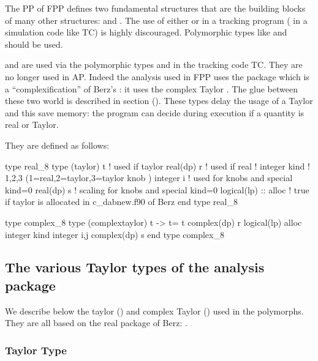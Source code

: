 \documentclass{hitec}     %
\begin{document}
{{{{{{The PP of FPP defines two fundamental structures that are the building blocks of many other structures:
 and . The  use of either  or   in a tracking program (
in a  simulation code like  TC) is highly discouraged. Polymorphic types like  and 
should be used.

  and  are used  via the polymorphic types  and  in the tracking code TC. They are no longer used in AP. Indeed the analysis used in FPP uses the package  which is a ``complexification'' of Berz's : it uses the complex Taylor . The glue between these two world is described in section (). These types delay the usage of a Taylor and this save memory: the program can decide during execution if a quantity is real or Taylor.
 


 
 
 They are defined as follows:
 
 \begin{code}
type real_8
 type (taylor) t ! used if taylor
 real(dp) r ! used if real
!
 integer kind !  1,2,3 (1=real,2=taylor,3=taylor knob )
 integer i ! used for knobs and special kind=0
 real(dp) s ! scaling for knobs and special kind=0
 logical(lp) :: alloc ! true if taylor is allocated in c_dabnew.f90 of Berz  
end type real_8

  
type complex_8
 type (complextaylor) t    -> t= t%
 complex(dp) r
 logical(lp) alloc
 integer kind
 integer i,j
 complex(dp) s
end type complex_8
 \end{code}
 
 \subsection{The various Taylor types of the analysis package}
\label{s:taylorall}


We describe below the taylor () and complex Taylor () used in the polymorphs. They  are all based on the real package of Berz: .

\subsubsection{Taylor Type}
\label{s:taylor}

}}}}}}
\end{document}
